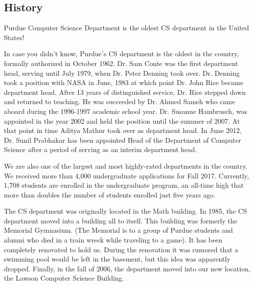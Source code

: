\subsection{History}

\begin{tcolorbox}[colback=green!5!white,colframe=green!75!black]
	Purdue Computer Science Department is the oldest CS department in the United States!
\end{tcolorbox}

In case you didn't know, Purdue's CS department is the oldest in the country, formally authorized in October 1962. Dr. Sam Conte was the first department head, serving until July 1979, when Dr. Peter Denning took over. Dr. Denning took a position with NASA in June, 1983 at which point Dr. John Rice became department head. After 13 years of distinguished service, Dr. Rice stepped down and returned to teaching. He was succeeded by Dr. Ahmed Sameh who came aboard during the 1996-1997 academic school year. Dr. Susanne Hambrusch, was appointed in the year 2002 and held the position until the summer of 2007. At that point in time Aditya Mathur took over as department head. In June 2012, Dr. Sunil Prabhakar has been appointed Head of the Department of Computer Science after a period of serving as an interim department head.

We are also one of the largest and most highly-rated departments in the country. We received more than 4,000 undergraduate applications for Fall 2017. Currently, 1,708 students are enrolled in the undergraduate program, an all-time high that more than doubles the number of students enrolled just five years ago.

The CS department was originally located in the Math building. In 1985, the CS department moved into a building all to itself. This building was formerly the Memorial Gymnasium. (The Memorial is to a group of Purdue students and alumni who died in a train wreck while traveling to a game). It has been completely renovated to hold us. During the renovation it was rumored that a swimming pool would be left in the basement, but this idea was apparently dropped. Finally, in the fall of 2006, the department moved into our new location, the Lawson Computer Science Building.
